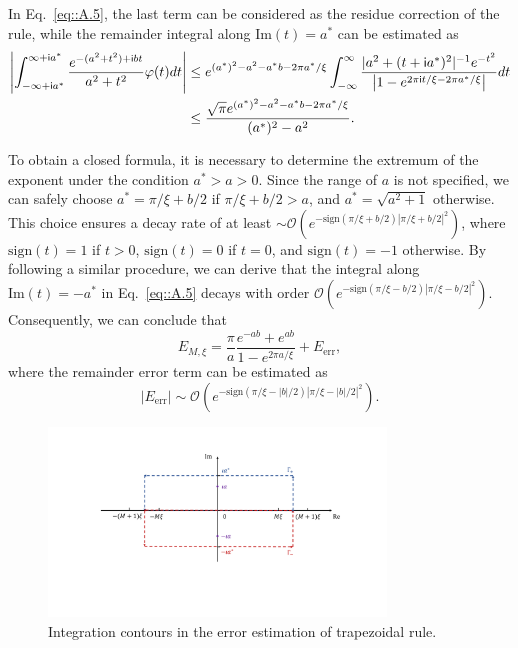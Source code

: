 In Eq.~\eqref{eq::A.5}, the last term can be considered as the residue correction of the rule, while the remainder integral along $\text{Im}(t)=a^*$ can be estimated as
\begin{equation}
\begin{split}
\left|\int_{-\infty+\mathsf i a^*}^{\infty+\mathsf i a^*}\frac{e^{-(a^2+t^2)+\mathsf i b t}}{a^2+t^2}\varphi(t)dt\right|&\leq e^{(a^*)^2-a^2-a^*b-2\pi a^*/\xi}\int_{-\infty}^{\infty}\frac{|a^2+(t+\mathsf i a^*)^2|^{-1}e^{-t^2}}{\left|1-e^{2\pi\mathsf i t/\xi-2\pi a^*/\xi}\right|}dt\\
&\leq\frac{\sqrt{\pi}e^{(a^*)^2-a^2-a^*b-2\pi a^*/\xi}}{(a^*)^2-a^2}.
\end{split}
\end{equation}

To obtain a closed formula, it is necessary to determine the extremum of the exponent under the condition $a^*>a>0$. Since the range of $a$ is not specified, we can safely choose $a^*=\pi/\xi+b/2$ if $\pi/\xi+b/2>a$, and $a^*=\sqrt{a^2+1}$ otherwise. This choice ensures a decay rate of at least $\sim\mathcal{O}(e^{-\text{sign}(\pi/\xi+b/2)|\pi/\xi+b/2|^2})$, where $\text{sign}(t)=1$ if $t> 0$, $\text{sign}(t)=0$ if $t=0$, and $\text{sign}(t)=-1$ otherwise. By following a similar procedure, we can derive that the integral along $\text{Im}(t)=-a^*$ in Eq.~\eqref{eq::A.5} decays with order $\mathcal{O}(e^{-\text{sign}(\pi/\xi-b/2)|\pi/\xi-b/2|^2})$. Consequently, we can conclude that
\begin{equation}
E_{M,\xi}=\frac{\pi}{a}\frac{e^{-ab}+e^{ab}}{1-e^{2\pi a/\xi}}+E_{\text{err}},
\end{equation}
where the remainder error term can be estimated as 
\begin{equation}\label{eq::A.8}
|E_{\text{err}}|\sim \mathcal{O}(e^{-\text{sign}(\pi/\xi-|b|/2)\left|\pi/\xi-|b|/2\right|^2}).
\end{equation}

\begin{figure}[!ht]
    \begin{center}
    \includegraphics[width=0.8\textwidth]{figs/Trapezoidal.pdf}
    \caption{Integration contours in the error estimation of trapezoidal rule.}
    \label{fig:Trapezoidal}
    \end{center} 
\end{figure}